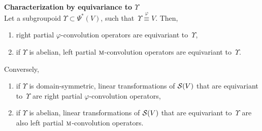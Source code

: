 \begin{proposition}\textbf{Characterization by equivariance to $\Upsilon$}\\
Let a subgroupoid $\Upsilon \subset \Psi^*(V)$, such that~$\Upsilon \overset\varphi\equiv V$. Then,
\begin{enumerate}[label=(\roman*)]
  \item right partial $\varphi$-convolution operators are equivariant to~$\Upsilon$,\label{enum:i}
  \item if $\Upsilon$ is abelian, left partial $\operatorname{\textsc{m}}$-convolution operators are equivariant to~$\Upsilon$.\label{enum:ii}
\end{enumerate}
Conversely,
\begin{enumerate}[label=(\roman*)]
  \item if $\Upsilon$ is domain-symmetric, linear transformations of $\mathcal{S}(V)$ that are equivariant to~$\Upsilon$ are right partial $\varphi$-convolution operators,
  \item if $\Upsilon$ is abelian, linear transformations of $\mathcal{S}(V)$ that are equivariant to~$\Upsilon$ are also left partial $\operatorname{\textsc{m}}$-convolution operators.
\end{enumerate}
\end{proposition}
